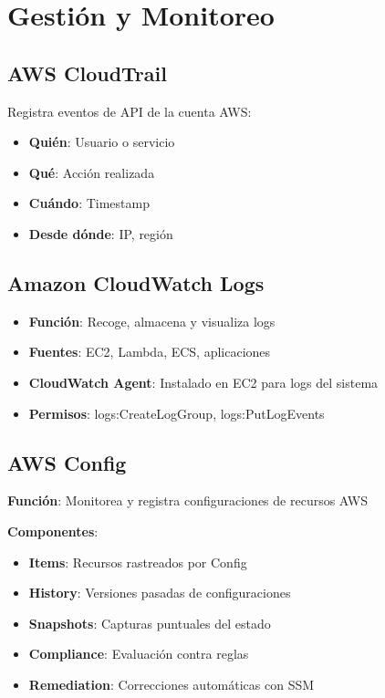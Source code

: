 \documentclass[12pt,a4paper]{report}
\begin{document}
\newpage

\chapter{Gestión y Monitoreo}

\section{AWS CloudTrail}

\begin{conceptbox}
Registra eventos de API de la cuenta AWS:
\begin{itemize}
    \item \textbf{Quién}: Usuario o servicio
    \item \textbf{Qué}: Acción realizada  
    \item \textbf{Cuándo}: Timestamp
    \item \textbf{Desde dónde}: IP, región
\end{itemize}
\end{conceptbox}

\section{Amazon CloudWatch Logs}

\begin{itemize}
    \item \textbf{Función}: Recoge, almacena y visualiza logs
    \item \textbf{Fuentes}: EC2, Lambda, ECS, aplicaciones
    \item \textbf{CloudWatch Agent}: Instalado en EC2 para logs del sistema
    \item \textbf{Permisos}: logs:CreateLogGroup, logs:PutLogEvents
\end{itemize}

\section{AWS Config}

\begin{conceptbox}
\textbf{Función}: Monitorea y registra configuraciones de recursos AWS

\textbf{Componentes}:
\begin{itemize}
    \item \textbf{Items}: Recursos rastreados por Config
    \item \textbf{History}: Versiones pasadas de configuraciones  
    \item \textbf{Snapshots}: Capturas puntuales del estado
    \item \textbf{Compliance}: Evaluación contra reglas
    \item \textbf{Remediation}: Correcciones automáticas con SSM
\end{itemize}
\end{conceptbox}
\end{document}

